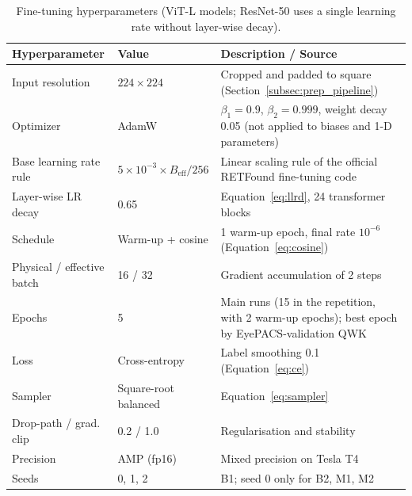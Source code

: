 \begin{table}[htbp]
    \centering
    \caption{Fine-tuning hyperparameters (ViT-L models; ResNet-50 uses a single learning rate without layer-wise decay).}
    \label{tab:hyperparameters}
    \begin{tabularx}{\textwidth}{l l X}
        \toprule
        \textbf{Hyperparameter} & \textbf{Value} & \textbf{Description / Source} \\
        \midrule
        Input resolution        & $224 \times 224$        & Cropped and padded to square (Section~\ref{subsec:prep_pipeline}) \\
        Optimizer               & AdamW                   & $\beta_1 = 0.9$, $\beta_2 = 0.999$, weight decay 0.05 (not applied to biases and 1-D parameters) \\
        Base learning rate rule & $5\times10^{-3}\times B_{\text{eff}}/256$ & Linear scaling rule of the official RETFound fine-tuning code \\
        Layer-wise LR decay     & 0.65                    & Equation~\eqref{eq:llrd}, 24 transformer blocks \\
        Schedule                & Warm-up + cosine        & 1 warm-up epoch, final rate $10^{-6}$ (Equation~\eqref{eq:cosine}) \\
        Physical / effective batch & 16 / 32              & Gradient accumulation of 2 steps \\
        Epochs                  & 5 & Main runs (15 in the repetition, with 2 warm-up epochs); best epoch by EyePACS-validation QWK \\
        Loss                    & Cross-entropy           & Label smoothing 0.1 (Equation~\eqref{eq:ce}) \\
        Sampler                 & Square-root balanced    & Equation~\eqref{eq:sampler} \\
        Drop-path / grad. clip  & 0.2 / 1.0               & Regularisation and stability \\
        Precision               & AMP (fp16)              & Mixed precision on Tesla T4 \\
        Seeds                   & 0, 1, 2                 & B1; seed 0 only for B2, M1, M2 \\
        \bottomrule
    \end{tabularx}
\end{table}
